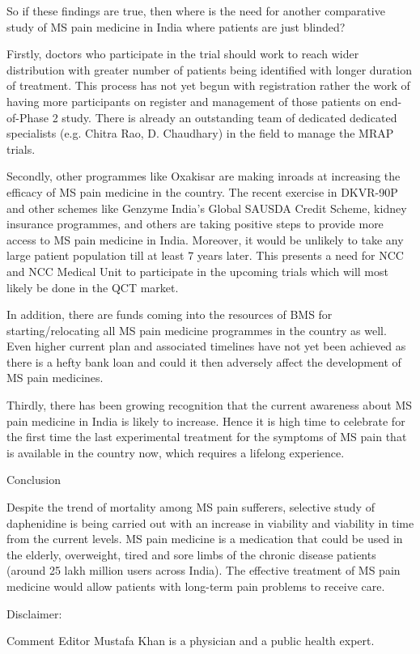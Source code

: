 \documentclass{article}
\begin{document}
So if these findings are true, then where is the need for another comparative study of MS pain medicine in India where patients are just blinded?

Firstly, doctors who participate in the trial should work to reach wider distribution with greater number of patients being identified with longer duration of treatment. This process has not yet begun with registration rather the work of having more participants on register and management of those patients on end-of-Phase 2 study. There is already an outstanding team of dedicated dedicated specialists (e.g. Chitra Rao, D. Chaudhary) in the field to manage the MRAP trials.

Secondly, other programmes like Oxakisar are making inroads at increasing the efficacy of MS pain medicine in the country. The recent exercise in DKVR-90P and other schemes like Genzyme India’s Global SAUSDA Credit Scheme, kidney insurance programmes, and others are taking positive steps to provide more access to MS pain medicine in India. Moreover, it would be unlikely to take any large patient population till at least 7 years later. This presents a need for NCC and NCC Medical Unit to participate in the upcoming trials which will most likely be done in the QCT market.

In addition, there are funds coming into the resources of BMS for starting/relocating all MS pain medicine programmes in the country as well. Even higher current plan and associated timelines have not yet been achieved as there is a hefty bank loan and could it then adversely affect the development of MS pain medicines.

Thirdly, there has been growing recognition that the current awareness about MS pain medicine in India is likely to increase. Hence it is high time to celebrate for the first time the last experimental treatment for the symptoms of MS pain that is available in the country now, which requires a lifelong experience.

Conclusion

Despite the trend of mortality among MS pain sufferers, selective study of daphenidine is being carried out with an increase in viability and viability in time from the current levels. MS pain medicine is a medication that could be used in the elderly, overweight, tired and sore limbs of the chronic disease patients (around 25 lakh million users across India). The effective treatment of MS pain medicine would allow patients with long-term pain problems to receive care.

Disclaimer:

Comment Editor Mustafa Khan is a physician and a public health expert.
\end{document}
